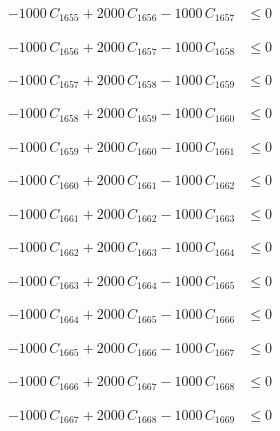 \documentclass[a4paper,11pt]{article}
\begin{document}
\begin{align}
-1000\,C_{1655} + 2000\,C_{1656} - 1000\,C_{1657} &\leq 0 \nonumber
\end{align}

\begin{align}
-1000\,C_{1656} + 2000\,C_{1657} - 1000\,C_{1658} &\leq 0 \nonumber
\end{align}

\begin{align}
-1000\,C_{1657} + 2000\,C_{1658} - 1000\,C_{1659} &\leq 0 \nonumber
\end{align}

\begin{align}
-1000\,C_{1658} + 2000\,C_{1659} - 1000\,C_{1660} &\leq 0 \nonumber
\end{align}

\begin{align}
-1000\,C_{1659} + 2000\,C_{1660} - 1000\,C_{1661} &\leq 0 \nonumber
\end{align}

\begin{align}
-1000\,C_{1660} + 2000\,C_{1661} - 1000\,C_{1662} &\leq 0 \nonumber
\end{align}

\begin{align}
-1000\,C_{1661} + 2000\,C_{1662} - 1000\,C_{1663} &\leq 0 \nonumber
\end{align}

\begin{align}
-1000\,C_{1662} + 2000\,C_{1663} - 1000\,C_{1664} &\leq 0 \nonumber
\end{align}

\begin{align}
-1000\,C_{1663} + 2000\,C_{1664} - 1000\,C_{1665} &\leq 0 \nonumber
\end{align}

\begin{align}
-1000\,C_{1664} + 2000\,C_{1665} - 1000\,C_{1666} &\leq 0 \nonumber
\end{align}

\begin{align}
-1000\,C_{1665} + 2000\,C_{1666} - 1000\,C_{1667} &\leq 0 \nonumber
\end{align}

\begin{align}
-1000\,C_{1666} + 2000\,C_{1667} - 1000\,C_{1668} &\leq 0 \nonumber
\end{align}

\begin{align}
-1000\,C_{1667} + 2000\,C_{1668} - 1000\,C_{1669} &\leq 0 \nonumber
\end{align}
\end{document}
